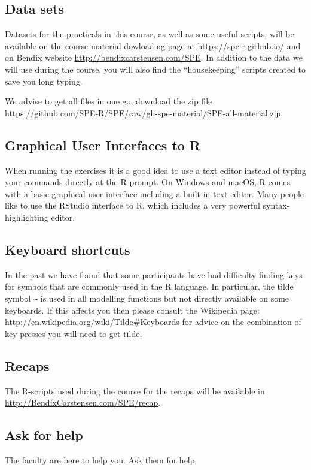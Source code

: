 
\subsection*{Data sets}

Datasets for the practicals in this course, as well as some useful \R
scripts, will be available on the course material dowloading page at \url{https://spe-r.github.io/} and on Bendix website \url{http://bendixcarstensen.com/SPE}. In addition to the data we will use during the course, you will
also find the ``housekeeping'' scripts created to save you long typing.

We advise to get all files in one go, download the zip
file \url{https://github.com/SPE-R/SPE/raw/gh-spe-material/SPE-all-material.zip}.

\subsection*{Graphical User Interfaces to R}

When running the exercises it is a good idea to use a text editor
instead of typing your commands directly at the R prompt. On Windows
and macOS, R comes with a basic graphical user interface including a
built-in text editor. Many people like to use the RStudio interface to
R, which includes a very powerful syntax-highlighting editor.

\subsection*{Keyboard shortcuts}

In the past we have found that some participants have had difficulty
finding keys for symbols that are commonly used in the R language.  In
particular, the tilde symbol \verb+~+ is used in all modelling
functions but not directly available on some keyboards. If this
affects you then please consult the Wikipedia
page: \url{http://en.wikipedia.org/wiki/Tilde#Keyboards} for advice on
the combination of key presses you will need to get tilde.

\subsection*{Recaps}
The R-scripts used during the course for the recaps will be available
in \url{http://BendixCarstensen.com/SPE/recap}.

\subsection*{Ask for help}

The faculty are here to help you. Ask them for help.


